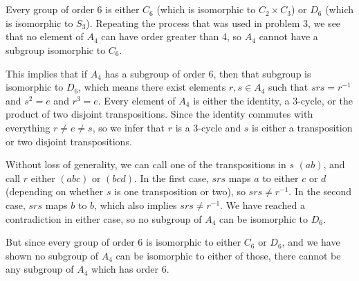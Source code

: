 \documentclass[12pt]{article}
\begin{document}
\section{}
\noindent{}\bigskip

Every group of order 6 is either $C_6$ (which is isomorphic to $C_2 \times C_3$) or $D_6$ (which is isomorphic to $S_3$). Repeating the process that was used in problem 3, we see that no element of $A_4$ can have order greater than 4, so $A_4$ cannot have a subgroup isomorphic to $C_6$.
\par
This implies that if $A_4$ has a subgroup of order 6, then that subgroup is isomorphic to $D_6$, which means there exist elements $r, s \in A_4$ such that $srs=r^{-1}$ and $s^2=e$ and $r^3=e$. Every element of $A_4$ is either the identity, a 3-cycle, or the product of two disjoint transpositions. Since the identity commutes with everything $r \neq e \neq s$, so we infer that $r$ is a 3-cycle and $s$ is either a transposition or two disjoint transpositions.
\par
Without loss of generality, we can call one of the transpositions in $s$ $(ab)$, and call $r$ either $(abc)$ or $(bcd)$. In the first case, $srs$ maps $a$ to either $c$ or $d$ (depending on whether $s$ is one transposition or two), so $srs \neq r^{-1}$. In the second case, $srs$ maps $b$ to $b$, which also implies $srs \neq r^{-1}$. We have reached a contradiction in either case, so no subgroup of $A_4$ can be isomorphic to $D_6$.
\par
But since every group of order 6 is isomorphic to either $C_6$ or $D_6$, and we have shown no subgroup of $A_4$ can be isomorphic to either of those, there cannot be any subgroup of $A_4$ which has order 6.
\end{document}
